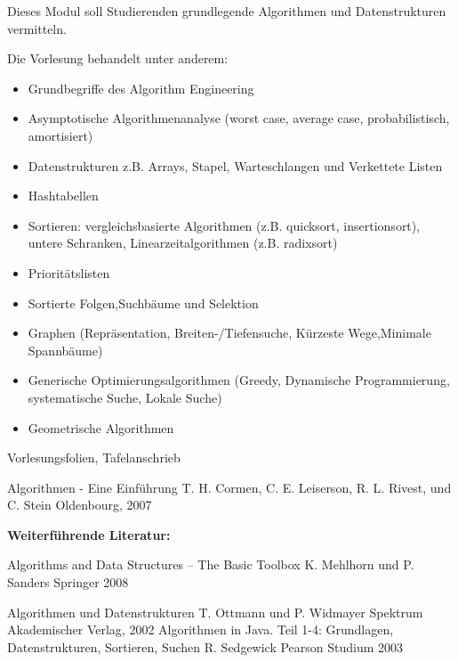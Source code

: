 \begin{course}
\begin{content}
Dieses Modul soll Studierenden grundlegende Algorithmen und Datenstrukturen vermitteln.

 

Die Vorlesung behandelt unter anderem:

 \begin{itemize}\item Grundbegriffe des Algorithm Engineering  \item Asymptotische Algorithmenanalyse (worst case, average case, probabilistisch, amortisiert)  \item Datenstrukturen z.B. Arrays, Stapel, Warteschlangen und Verkettete Listen  \item Hashtabellen  \item Sortieren: vergleichsbasierte Algorithmen (z.B. quicksort, insertionsort), untere Schranken, Linearzeitalgorithmen (z.B. radixsort)  \item Prioritätslisten  \item Sortierte Folgen,Suchbäume und Selektion  \item Graphen (Repräsentation, Breiten-/Tiefensuche, Kürzeste Wege,Minimale Spannbäume)  \item Generische Optimierungsalgorithmen (Greedy, Dynamische Programmierung, systematische Suche, Lokale Suche)  \item Geometrische Algorithmen  \end{itemize}
\end{content}

\begin{media}Vorlesungsfolien, Tafelanschrieb

\end{media}

\begin{literature}Algorithmen - Eine Einführung\newline
T. H. Cormen, C. E. Leiserson, R. L. Rivest, und C. Stein\newline
Oldenbourg, 2007

 

\textbf{Weiterführende Literatur:}

 

Algorithms and Data Structures -- The Basic Toolbox\newline
K. Mehlhorn und P. Sanders\newline
Springer 2008

 

Algorithmen und Datenstrukturen\newline
T. Ottmann und P. Widmayer\newline
Spektrum Akademischer Verlag, 2002\newline
\newline
Algorithmen in Java. Teil 1-4: Grundlagen, Datenstrukturen, Sortieren, Suchen \newline
R. Sedgewick\newline
Pearson Studium 2003


\end{literature}
\end{course}
